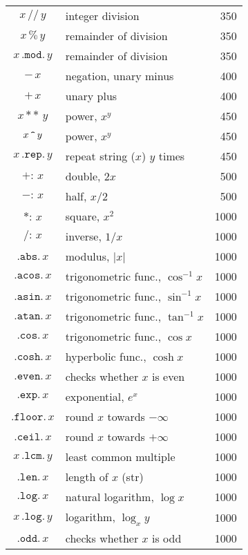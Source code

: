 \documentclass[11pt,a4paper]{refrep}
\begin{document}
\begin{description}
\begin{center}
\begin{longtable}{|c|p{12em}|r|}
   $x\,\mathtt{//}\,y$ & integer division & 350\\
   $x\,\mathtt{\%}\,y$ & remainder of division & 350\\
   $x\,\mathtt{.mod.}\,y$ & remainder of division & 350\\
   $\mathtt{-}\,x$ & negation, unary minus & 400\\
   $\mathtt{+}\,x$ & unary plus & 400\\
   $x\,\mathtt{**}\,y$ & power, $x^y$ & 450\\
   $x\,\text{\tt\textasciicircum}\,y$ & power, $x^y$ & 450\\
   $x\,\mathtt{.rep.}\,y$ & repeat string ($x$) $y$ times & 450\\
   $\mathtt{+:}\,x$ & double, $2x$ & 500\\
   $\mathtt{-:}\,x$ & half, $x/2$ & 500\\
   $\mathtt{*:}\,x$ & square, $x^2$ & 1000\\
   $\mathtt{/:}\,x$ & inverse, $1/x$ & 1000\\
   $\mathtt{.abs.}\,x$ & modulus, $\vert x\vert$ & 1000\\
   $\mathtt{.acos.}\,x$ & trigonometric func., $\cos^{-1} x$ & 1000\\
   $\mathtt{.asin.}\,x$ & trigonometric func., $\sin^{-1} x$ & 1000\\
   $\mathtt{.atan.}\,x$ & trigonometric func., $\tan^{-1} x$ & 1000\\
   $\mathtt{.cos.}\,x$ & trigonometric func., $\cos x$ & 1000\\
   $\mathtt{.cosh.}\,x$ & hyperbolic func., $\cosh x$ & 1000\\
   $\mathtt{.even.}\,x$ & checks whether $x$ is even & 1000\\
   $\mathtt{.exp.}\,x$ & exponential, $e^x$ & 1000\\
   $\mathtt{.floor.}\,x$ & round $x$ towards $-\infty$ & 1000\\
   $\mathtt{.ceil.}\,x$ & round $x$ towards $+\infty$ & 1000\\
   $x\,\mathtt{.lcm.}\,y$ & least common multiple & 1000\\
   $\mathtt{.len.}\,x$ & length of $x$ (str) & 1000\\
   $\mathtt{.log.}\,x$ & natural logarithm, $\log x$ & 1000\\
   $x\,\mathtt{.log.}\,y$ & logarithm, $\log_x y$ & 1000\\
   $\mathtt{.odd.}\,x$ & checks whether $x$ is odd & 1000\\

\end{longtable}
\end{center}
\end{description}
\end{document}
